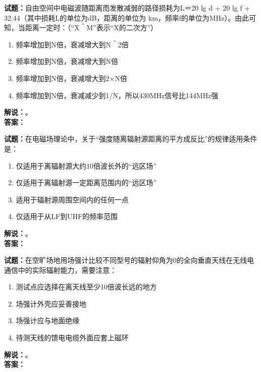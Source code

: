 \documentclass{ctexbook}
\begin{document}
\vspace{\baselineskip}

\noindent\textbf{试题：}自由空间中电磁波随距离而发散减弱的路径损耗为L＝20 lg d + 20 lg f + 32.44（其中损耗L的单位为dB，距离的单位为 km，频率f的单位为\unit{\MHz}）。由此可知，当距离一定时：（“X＾M”表示“X的二次方”）
\begin{enumerate}[leftmargin=3em]
  \item 频率增加到N倍，衰减增大到N＾2倍
  \item 频率增加到N倍，衰减增大到N倍
  \item 频率增加到N倍，衰减增大到2×N倍
  \item 频率增加到N倍，衰减减少到1/N，所以430\unit{\MHz}信号比144\unit{\MHz}强
\end{enumerate}
\noindent\textbf{解说：}\textbf{}。\\\noindent\textbf{答案：}

\vspace{\baselineskip}

\noindent\textbf{试题：}在电磁场理论中，关于“强度随离辐射源距离的平方成反比”的规律适用条件是：
\begin{enumerate}[leftmargin=3em]
  \item 仅适用于离辐射源大约10倍波长外的“远区场”
  \item 仅适用于离辐射源一定距离范围内的“远区场”
  \item 适用于辐射源周围空间内的任何一点
  \item 仅适用于从LF到UHF的频率范围
\end{enumerate}
\noindent\textbf{解说：}\textbf{}。\\\noindent\textbf{答案：}

\vspace{\baselineskip}

\noindent\textbf{试题：}在空旷场地用场强计比较不同型号的辐射仰角为0的全向垂直天线在无线电通信中的实际辐射能力，需要注意：
\begin{enumerate}[leftmargin=3em]
  \item 测试点应选择在离天线至少10倍波长远的地方
  \item 场强计外壳应妥善接地
  \item 场强计应与地面绝缘
  \item 待测天线的馈电电缆外面应套上磁环
\end{enumerate}
\noindent\textbf{解说：}\textbf{}。\\\noindent\textbf{答案：}

\vspace{\baselineskip}
\end{document}

